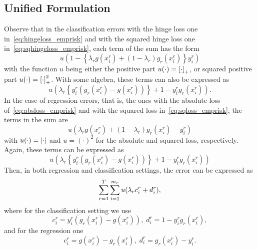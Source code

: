 \subsection{Unified Formulation}
Observe that in the classification errors with the hinge loss one in~\eqref{eq:hingeloss_emprisk} and with the squared hinge loss one in~\eqref{eq:sqhingeloss_emprisk}, each term of the sum has the form
\begin{equation}
    \nonumber
    u\left(1 - \left\{\lambda_r g(x_i^r) + (1-\lambda_r) g_r(x_i^r)  \right\} y_i^r\right)
\end{equation}
with the function $u$ being either the positive part $u(\cdot)=\left[\cdot\right]_{+}$, or squared positive part $u(\cdot)=\left[\cdot\right]_{+}^2$.
With some algebra, these terms can also be expressed as
\begin{equation}
    \nonumber
    u\left(\lambda_r \left\{ y_i^r (g_r(x_i^r) - g(x_i^r)) \right\} +  1 - y_i^r g_r(x_i^r) \right).
\end{equation}
In the case of regression errors, that is, the ones with the absolute loss of~\eqref{eq:absloss_emprisk} and with the squared loss in~\eqref{eq:sqloss_emprisk}, the terms in the sum are
\begin{equation}
    \nonumber
    u\left(\lambda_r g(x_i^r) + (1-\lambda_r)g_r(x_i^r) - y_i^r\right)
\end{equation}
with $u(\cdot)=\left|\cdot\right|$ and $u=(\cdot)^2$ for the absolute and squared loss, respectively. Again, these terms can be expressed as 
\begin{equation}
    \nonumber
    u\left(\lambda_r \left\{ y_i^r (g_r(x_i^r) - g(x_i^r)) \right\} +  1 - y_i^r g_r(x_i^r) \right)
\end{equation}
Then, in both regression and classification settings, the error can be expressed as
\begin{equation}
    \nonumber
    \sum_{r=1}^T \sum_{i=1}^{m_r} u(\lambda_r c_i^r + d_i^r),
\end{equation}
where for the classification setting we use
\begin{equation}
    \label{eq:changevar_clas}
    c_i^r =  y_i^r (g_r(x_i^r) - g(x_i^r))  , \;  d_i^r =  1 - y_i^r g_r(x_i^r) ,
\end{equation}
and for the regression one\begin{equation}
    \label{eq:changevar_reg}
    c_i^r = g(x_i^r) - g_r(x_i^r)  , \;  d_i^r =  g_r(x_i^r) - y_i^r .
\end{equation}

